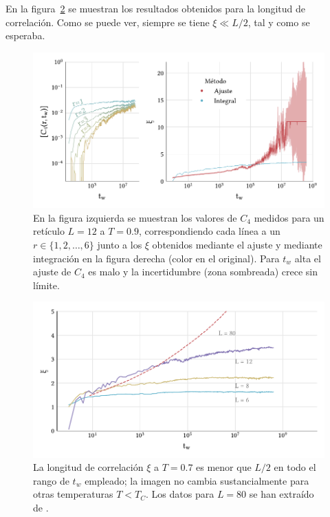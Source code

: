 \documentclass[11pt]{report}
\newcommand{\sub}[1]{ _{{\scriptscriptstyle \mathit{#1}}}  }
\begin{document}
En la figura~\ref{fig:C4_with_size} se muestran los resultados
obtenidos para la longitud de correlación. Como se puede ver, siempre se
tiene $ξ ≪ L/2$, tal y como se esperaba.


\begin{figure}[!h]
  \centering
  \includegraphics{../study_cases/c4_functional_dependence/C4_handedit.pdf}
  \caption{En la figura izquierda se muestran los valores de $C_4$
    medidos para un retículo $L=12$ a $T=0.9$, correspondiendo cada
    línea a un $r∈\{1,2,\ldots,6\}$ junto a los $ξ$ obtenidos mediante
    el ajuste y mediante integración en la figura derecha (color en el
    original). Para $t_w$ alta el ajuste de $C_4$ es malo y la
    incertidumbre (zona sombreada) crece sin límite.}
  \label{fig:c4}
\end{figure}

\begin{figure}[!h]
  \centering

  \vspace{1cm}

  \includegraphics{../study_cases/c4_functional_dependence/C4_with_size.pdf}
  \caption{La longitud de correlación $ξ$ a $T=0.7$ es menor que $L/2$
    en todo el rango de $t_w$ empleado; la imagen no cambia
    sustancialmente para otras temperaturas $T<T\sub{C}$. Los datos
    para $L=80$ se han extraído de \cite{c4integration}.}
  \label{fig:C4_with_size}
\end{figure}
\end{document}
